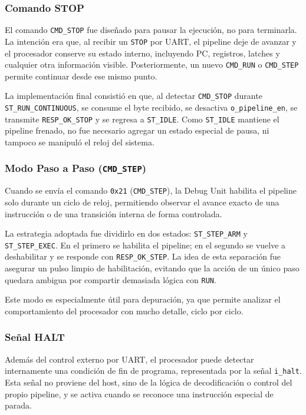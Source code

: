 \subsubsection{Comando STOP}

El comando \texttt{CMD\_STOP} fue diseñado para pausar la ejecución, no para terminarla. La intención era que, al recibir un \texttt{STOP} por UART, el pipeline deje de avanzar y el procesador conserve su estado interno, incluyendo PC, registros, latches y cualquier otra información visible. Posteriormente, un nuevo \texttt{CMD\_RUN} o \texttt{CMD\_STEP} permite continuar desde ese mismo punto.

La implementación final consistió en que, al detectar \texttt{CMD\_STOP} durante \texttt{ST\_RUN\_CONTINUOUS}, se consume el byte recibido, se desactiva \texttt{o\_pipeline\_en}, se transmite \texttt{RESP\_OK\_STOP} y se regresa a \texttt{ST\_IDLE}. Como \texttt{ST\_IDLE} mantiene el pipeline frenado, no fue necesario agregar un estado especial de pausa, ni tampoco se manipuló el reloj del sistema.

\subsubsection{Modo Paso a Paso (\texttt{CMD\_STEP})}
Cuando se envía el comando \texttt{0x21} (\texttt{CMD\_STEP}), la Debug Unit habilita el pipeline solo durante un ciclo de reloj, permitiendo observar el avance exacto de una instrucción o de una transición interna de forma controlada. 

La estrategia adoptada fue dividirlo en dos estados: \texttt{ST\_STEP\_ARM} y \texttt{ST\_STEP\_EXEC}. En el primero se habilita el pipeline; en el segundo se vuelve a deshabilitar y se responde con \texttt{RESP\_OK\_STEP}. La idea de esta separación fue asegurar un pulso limpio de habilitación, evitando que la acción de un único paso quedara ambigua por compartir demasiada lógica con \texttt{RUN}.

Este modo es especialmente útil para depuración, ya que permite analizar el comportamiento del procesador con mucho detalle, ciclo por ciclo.

\subsubsection{Señal HALT}

Además del control externo por UART, el procesador puede detectar internamente una condición de fin de programa, representada por la señal \texttt{i\_halt}. Esta señal no proviene del host, sino de la lógica de decodificación o control del propio pipeline, y se activa cuando se reconoce una instrucción especial de parada.

